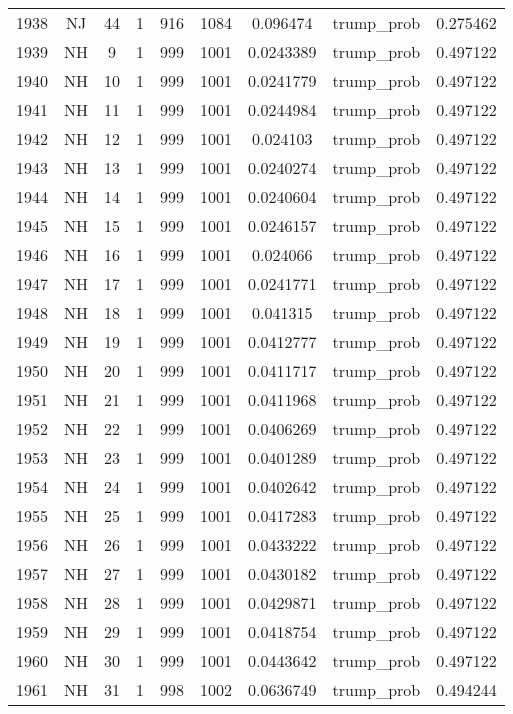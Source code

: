 \documentclass[12pt,a4paper]{article}
\begin{document}
\begin{tabular}{r|cccccccc}
	1938 & NJ & 44 & 1 & 916 & 1084 & 0.096474 & trump\_prob & 0.275462 \\
	1939 & NH & 9 & 1 & 999 & 1001 & 0.0243389 & trump\_prob & 0.497122 \\
	1940 & NH & 10 & 1 & 999 & 1001 & 0.0241779 & trump\_prob & 0.497122 \\
	1941 & NH & 11 & 1 & 999 & 1001 & 0.0244984 & trump\_prob & 0.497122 \\
	1942 & NH & 12 & 1 & 999 & 1001 & 0.024103 & trump\_prob & 0.497122 \\
	1943 & NH & 13 & 1 & 999 & 1001 & 0.0240274 & trump\_prob & 0.497122 \\
	1944 & NH & 14 & 1 & 999 & 1001 & 0.0240604 & trump\_prob & 0.497122 \\
	1945 & NH & 15 & 1 & 999 & 1001 & 0.0246157 & trump\_prob & 0.497122 \\
	1946 & NH & 16 & 1 & 999 & 1001 & 0.024066 & trump\_prob & 0.497122 \\
	1947 & NH & 17 & 1 & 999 & 1001 & 0.0241771 & trump\_prob & 0.497122 \\
	1948 & NH & 18 & 1 & 999 & 1001 & 0.041315 & trump\_prob & 0.497122 \\
	1949 & NH & 19 & 1 & 999 & 1001 & 0.0412777 & trump\_prob & 0.497122 \\
	1950 & NH & 20 & 1 & 999 & 1001 & 0.0411717 & trump\_prob & 0.497122 \\
	1951 & NH & 21 & 1 & 999 & 1001 & 0.0411968 & trump\_prob & 0.497122 \\
	1952 & NH & 22 & 1 & 999 & 1001 & 0.0406269 & trump\_prob & 0.497122 \\
	1953 & NH & 23 & 1 & 999 & 1001 & 0.0401289 & trump\_prob & 0.497122 \\
	1954 & NH & 24 & 1 & 999 & 1001 & 0.0402642 & trump\_prob & 0.497122 \\
	1955 & NH & 25 & 1 & 999 & 1001 & 0.0417283 & trump\_prob & 0.497122 \\
	1956 & NH & 26 & 1 & 999 & 1001 & 0.0433222 & trump\_prob & 0.497122 \\
	1957 & NH & 27 & 1 & 999 & 1001 & 0.0430182 & trump\_prob & 0.497122 \\
	1958 & NH & 28 & 1 & 999 & 1001 & 0.0429871 & trump\_prob & 0.497122 \\
	1959 & NH & 29 & 1 & 999 & 1001 & 0.0418754 & trump\_prob & 0.497122 \\
	1960 & NH & 30 & 1 & 999 & 1001 & 0.0443642 & trump\_prob & 0.497122 \\
	1961 & NH & 31 & 1 & 998 & 1002 & 0.0636749 & trump\_prob & 0.494244 \\

\end{tabular}
\end{document}
